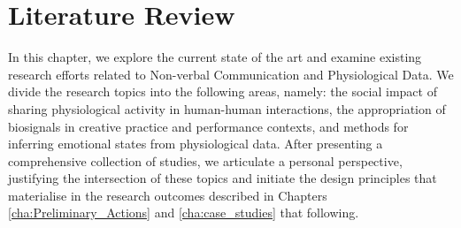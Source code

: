 

\chapter{Literature Review}
\label{cha:lit_review}

In this chapter, we explore the current state of the art and examine existing research efforts related to Non-verbal Communication and Physiological Data. We divide the research topics into the following areas, namely: the social impact of sharing physiological activity in human-human interactions, the appropriation of biosignals in creative practice and performance contexts, and methods for inferring emotional states from physiological data. After presenting a comprehensive collection of studies, we articulate a personal perspective, justifying the intersection of these topics and initiate the design principles that materialise in the research outcomes described in Chapters \ref{cha:Preliminary_Actions} and \ref{cha:case_studies} that following.

